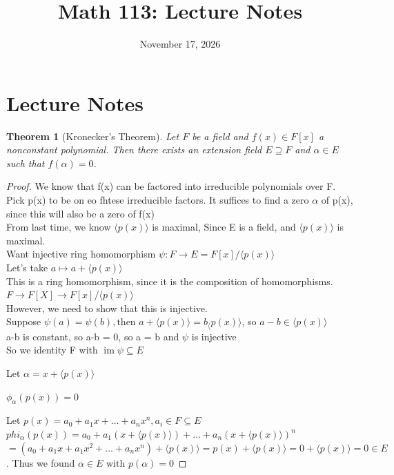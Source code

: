 \documentclass[11pt]{article}
\title{Math 113: Lecture Notes}
\author{}
\date{November 17, 2026}
\newtheorem{theorem}{Theorem}[section]
\theoremstyle{definition}
\theoremstyle{remark}
\begin{document}
\maketitle

\section{Lecture Notes}

\begin{theorem}[Kronecker's Theorem]
Let $F$ be a field and $f(x) \in F[x]$ a nonconstant polynomial.
Then there exists an extension field $E \supseteq F$
and $\alpha \in E$ such that $f(\alpha) = 0$.
\end{theorem}

\begin{proof}
We know that f(x) can be factored into irreducible polynomials over F. Pick p(x) to be on eo fhtese irreducible factors. It suffices to find a zero $\alpha$ of p(x), since this will also be a zero of f(x)
\\From last time, we know $\langle p(x) \rangle$ is maximal, Since E is a field, and $\langle p(x) \rangle$ is maximal. 
\\ Want injective ring homomorphism $\psi:F \rightarrow E = F[x] / \langle p(x) \rangle$
\\ Let's take $a \mapsto a + \langle p(x) \rangle$
\\This is a ring homomorphism, since it is the composition of homomorphisms. $F \rightarrow F[X] \rightarrow F[x] / \langle p(x) \rangle$
\\However, we need to show that this is injective. 
\\Suppose $\psi(a) = \psi(b), \text{then } a+\langle p(x) \rangle = b _ \langle p(x) \rangle$, so $a-b \in \langle p(x) \rangle$
\\a-b is constant, so a-b = 0, so a = b and $\psi $ is injective
\\ So we identity F with $\operatorname{im}{\psi} \subseteq E$


Let $\alpha = x + \langle p(x) \rangle$ 

$\phi_{\alpha}(p(x)) = 0$

Let $p(x) = a_0 + a_1x + \dots + a_nx^n, a_i \in F \subseteq E$
$phi_{\alpha}(p(x)) = a_0 + a_1(x + \langle p(x) \rangle) + \dots + a_n(x+ \langle p(x) \rangle)^n$
$= (a_0 + a_1x + a_1x^2 + \dots + a_nx^n) + \langle p(x) \rangle = p(x) + \langle p(x) \rangle = 0 + \langle p(x) \rangle = 0 \in E$. Thus we found $\alpha \in E \text{ with } p(\alpha) = 0$

\end{proof}
\end{document}
